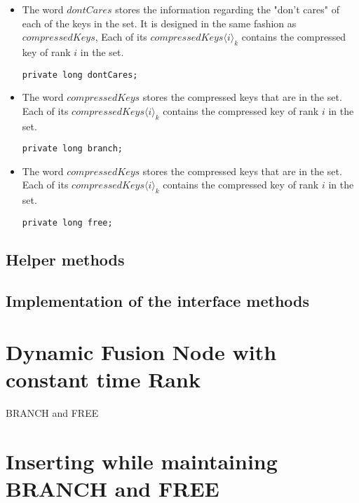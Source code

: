 \begin{itemize}
    \item
    The word $dontCares$ stores the information regarding the "don't cares" of each of the keys in the set. It is designed in the same fashion as $compressedKeys$, Each of its $compressedKeys\langle i \rangle_k$ contains the compressed key of rank $i$ in the set.
    \begin{lstlisting}
private long dontCares;
    \end{lstlisting}
    
    \item
    The word $compressedKeys$ stores the compressed keys that are in the set. Each of its $compressedKeys\langle i \rangle_k$ contains the compressed key of rank $i$ in the set.
    \begin{lstlisting}
private long branch;
    \end{lstlisting}
    
    \item
    The word $compressedKeys$ stores the compressed keys that are in the set. Each of its $compressedKeys\langle i \rangle_k$ contains the compressed key of rank $i$ in the set.
    \begin{lstlisting}
private long free;
    \end{lstlisting}
\end{itemize}



\subsection{Helper methods}

\subsection{Implementation of the interface methods}

\section{Dynamic Fusion Node with constant time Rank}
BRANCH and FREE

\section{Inserting while maintaining BRANCH and FREE}

